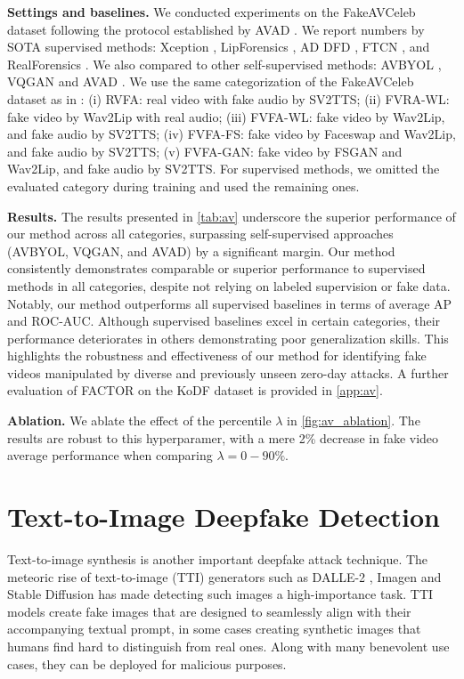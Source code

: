 \documentclass{article} \usepackage{iclr2024_conference,times}
\begin{document}
\textbf{Settings and baselines.} We conducted experiments on the FakeAVCeleb dataset \citep{fakeavceleb} following the protocol established by AVAD \citep{owens}. We report numbers by SOTA supervised methods: Xception \citep{learning3_ff++}, LipForensics \citep{lip_forensics}, AD DFD \citep{AD_DFD}, FTCN \citep{ftcn}, and RealForensics \citep{real_forensics}. We also compared to other self-supervised methods: AVBYOL \citep{byol,real_forensics}, VQGAN \citep{vqgan} and AVAD \citep{owens}. We use the same categorization of the FakeAVCeleb dataset as in \citet{owens}: (i) RVFA: real video with fake audio by SV2TTS; (ii) FVRA-WL: fake video by Wav2Lip with real audio; (iii) FVFA-WL: fake video by Wav2Lip, and fake audio by SV2TTS; (iv) FVFA-FS: fake video by Faceswap and Wav2Lip, and fake audio by SV2TTS; (v) FVFA-GAN: fake video by FSGAN and Wav2Lip, and fake audio by SV2TTS. For supervised methods, we omitted the evaluated category during training and used the remaining ones.

\textbf{Results.} The results presented in \cref{tab:av} underscore the superior performance of our method across all categories, surpassing self-supervised approaches (AVBYOL, VQGAN, and AVAD) by a significant margin. Our method consistently demonstrates comparable or superior performance to supervised methods in all categories, despite not relying on labeled supervision or fake data. Notably, our method outperforms all supervised baselines in terms of average AP and ROC-AUC. Although supervised baselines excel in certain categories, their performance deteriorates in others demonstrating poor generalization skills. This highlights the robustness and effectiveness of our method for identifying fake videos manipulated by diverse and previously unseen zero-day attacks. A further evaluation of FACTOR on the KoDF \citep{kodf} dataset is provided in \cref{app:av}.

\textbf{Ablation.} We ablate the effect of the percentile $\lambda$ in \cref{fig:av_ablation}. The results are robust to this hyperparamer, with a mere 2\% decrease in fake video average performance when comparing $\lambda=0-90\%$. 


\section{Text-to-Image Deepfake Detection}
\label{sec:text-to-image}

Text-to-image synthesis is another important deepfake attack technique. The meteoric rise of text-to-image (TTI) generators such as DALLE-2 \citep{dalle-2}, Imagen \citep{imagen} and Stable Diffusion \citep{stable_diffusion} has made detecting such images a high-importance task. TTI models create fake images that are designed to seamlessly align with their accompanying textual prompt, in some cases creating synthetic images that humans find hard to distinguish from real ones. Along with many benevolent use cases, they can be deployed for malicious purposes.
\end{document}

